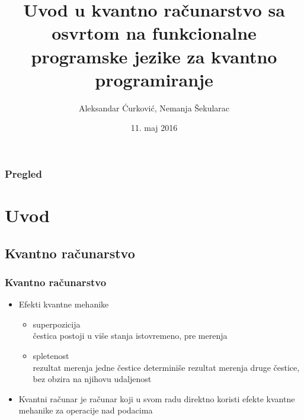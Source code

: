 \documentclass[12pt,hyperref={unicode}]{beamer}
\title[Short title]{Uvod u kvantno računarstvo sa osvrtom na funkcionalne programske jezike za kvantno programiranje} %
\author{Aleksandar Ćurković, Nemanja Šekularac} %
\institute %
{
Matematički fakultet \\ %
\medskip
\textit{nsekularac@gmail.com, curkovical@gmail.com} %
}
\date{11. maj 2016} %
\begin{document}
\begin{frame}
\titlepage %
\end{frame}

\begin{frame}
\frametitle{Pregled} %
\tableofcontents %
\end{frame}


\section{Uvod} %

\subsection{Kvantno računarstvo}%


\begin{frame}
\frametitle{Kvantno računarstvo}
\begin{itemize}

\item{Efekti kvantne mehanike}
	\begin{itemize}
    \item{superpozicija}\\
	čestica postoji u više stanja istovremeno, pre merenja
    \item{spletenost}\\
	rezultat merenja jedne čestice determiniše rezultat merenja druge čestice, bez obzira na njihovu udaljenost
    \end{itemize}
\item{Kvantni računar je računar koji u svom radu direktno koristi efekte kvantne mehanike za operacije nad podacima}
\end{itemize}

\end{frame}
\end{document}
